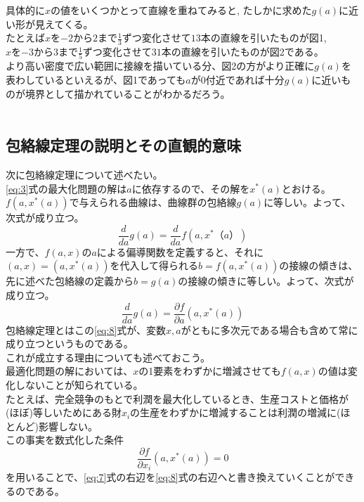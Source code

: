 \documentclass[11pt,a4j,fleqn]{jarticle}
\begin{document}
具体的に$x$の値をいくつかとって直線を重ねてみると, たしかに求めた$g(a)$に近い形が見えてくる。\\
たとえば$x$を$-2$から$2$まで$\frac{1}{3}$ずつ変化させて$13$本の直線を引いたものが図1, \\
$x$を$-3$から$3$まで$\frac{1}{5}$ずつ変化させて$31$本の直線を引いたものが図2である。\\
より高い密度で広い範囲に接線を描いている分、図2の方がより正確に$g(a)$を表わしているといえるが、図1であっても$a$が0付近であれば十分$g(a)$に近いものが境界として描かれていることがわかるだろう。\\
\\
\subsection{包絡線定理の説明とその直観的意味}
次に包絡線定理について述べたい。\\
\eqref{eq:3}式の最大化問題の解は$a$に依存するので、その解を$x^* (a)$とおける。
$f(a,x^* (a))$で与えられる曲線は、曲線群の包絡線$g(a)$に等しい。よって、次式が成り立つ。
\begin{equation}
\frac{d}{da}g(a)=\frac{d}{da}f(a,x^*（a）)\label{eq:7}
\end{equation}
一方で、$f(a,x)$の$a$による偏導関数を定義すると、それに$(a,x)=(a,x^*(a))$を代入して得られる$b=f(a,x^* (a))$の接線の傾きは、先に述べた包絡線の定義から$b=g(a)$の接線の傾きに等しい。よって、次式が成り立つ。
\begin{equation}
\frac{d}{da}g(a)=\frac{\partial f}{\partial a}(a, x^* (a)) \label{eq:8}
\end{equation}
包絡線定理とはこの\eqref{eq:8}式が、変数$x,a$がともに多次元である場合も含めて常に成り立つというものである。\\
これが成立する理由についても述べておこう。\\
最適化問題の解においては、$x$の1要素をわずかに増減させても$f(a,x)$の値は変化しないことが知られている。\\
たとえば、完全競争のもとで利潤を最大化しているとき、生産コストと価格が(ほぼ)等しいためにある財$x_i$の生産をわずかに増減することは利潤の増減に(ほとんど)影響しない。\\
この事実を数式化した条件
\begin{equation*}
\frac{\partial f}{\partial x_i}(a,x^* (a))=0
\end{equation*}
を用いることで、\eqref{eq:7}式の右辺を\eqref{eq:8}式の右辺へと書き換えていくことができるのである。
\end{document}
